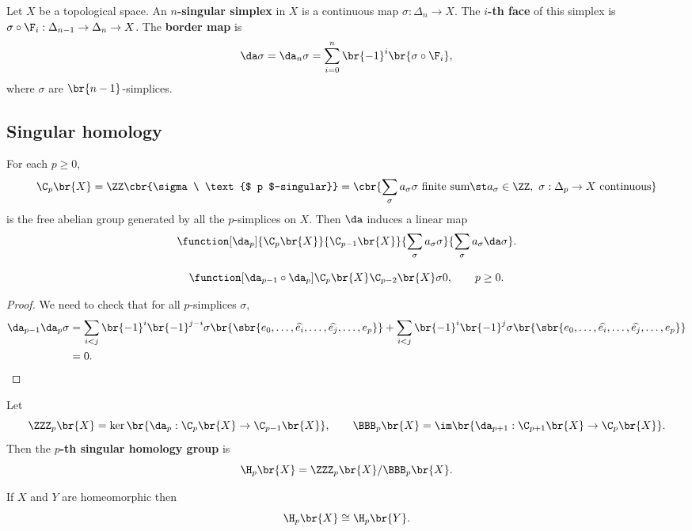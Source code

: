 \begin{definition}
Let $ X $ be a topological space. An \textbf{$ n $-singular simplex} in $ X $ is a continuous map $ \sigma : \Delta_n \to X $. The \textbf{$ i $-th face} of this simplex is $ \sigma \circ \F_i : \Delta_{n - 1} \to \Delta_n \to X $. The \textbf{border map} is
$$ \da\sigma = \da_n\sigma = \sum_{i = 0}^n \br{-1}^i\br{\sigma \circ \F_i}, $$
where $ \sigma $ are $ \br{n - 1} $-simplices.
\end{definition}

\subsection{Singular homology}

\begin{definition}
For each $ p \ge 0 $,
$$ \C_p\br{X} = \ZZ\cbr{\sigma \ \text{$ p $-singular}} = \cbr{\sum_\sigma a_\sigma\sigma \ \text{finite sum} \st a_\sigma \in \ZZ, \ \sigma : \Delta_p \to X \ \text{continuous}} $$
is the free abelian group generated by all the $ p $-simplices on $ X $. Then $ \da $ induces a linear map
$$ \function[\da_p]{\C_p\br{X}}{\C_{p - 1}\br{X}}{\sum_\sigma a_\sigma\sigma}{\sum_\sigma a_\sigma\da\sigma}. $$
\end{definition}

\begin{lemma}
$$ \function[\da_{p - 1} \circ \da_p]{\C_p\br{X}}{\C_{p - 2}\br{X}}{\sigma}{0}, \qquad p \ge 0. $$
\end{lemma}

\begin{proof}
We need to check that for all $ p $-simplices $ \sigma $,
\begin{align*}
\da_{p - 1}\da_p\sigma
& = \sum_{i < j} \br{-1}^i\br{-1}^{j - i}\sigma\br{\sbr{e_0, \dots, \widehat{e_i}, \dots, \widehat{e_j}, \dots, e_p}} + \sum_{i < j} \br{-1}^i\br{-1}^j\sigma\br{\sbr{e_0, \dots, \widehat{e_i}, \dots, \widehat{e_j}, \dots, e_p}} \\
& = 0.
\end{align*}
\end{proof}

Let
$$ \ZZZ_p\br{X} = \ker \br{\da_p : \C_p\br{X} \to \C_{p - 1}\br{X}}, \qquad \BBB_p\br{X} = \im \br{\da_{p + 1} : \C_{p + 1}\br{X} \to \C_p\br{X}}. $$
Then the \textbf{$ p $-th singular homology group} is
$$ \H_p\br{X} = \ZZZ_p\br{X} / \BBB_p\br{X}. $$

\begin{exercise*}
If $ X $ and $ Y $ are homeomorphic then
$$ \H_p\br{X} \cong \H_p\br{Y}. $$
\end{exercise*}

